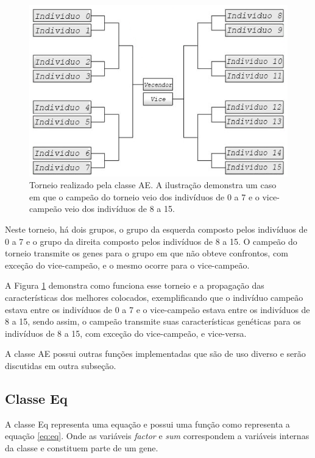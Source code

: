 \begin{figure}[htb]
    \caption{Torneio realizado pela classe AE. A ilustração demonstra um caso em que o campeão do torneio veio dos indivíduos de 0 a 7 e o vice-campeão veio dos indivíduos de 8 a 15.}
    \label{figura:funcao_playAll}
    \centering
    \includegraphics[scale=0.8]{images/ps/mata-mata}
    \fautor
\end{figure}

Neste torneio, há dois grupos, o grupo da esquerda composto pelos indivíduos de 0 a 7 e o grupo da direita composto pelos indivíduos de 8 a 15. O campeão do torneio transmite os genes para o grupo em que não obteve confrontos, com exceção do vice-campeão, e o mesmo ocorre para o vice-campeão.

A Figura \ref{figura:funcao_playAll} demonstra como funciona esse torneio e a propagação das características dos melhores colocados, exemplificando que o indivíduo campeão estava entre os indivíduos de 0 a 7 e o vice-campeão estava entre os indivíduos de 8 a 15, sendo assim, o campeão transmite suas características genéticas para os indivíduos de 8 a 15, com exceção do vice-campeão, e vice-versa.

A classe AE possui outras funções implementadas que são de uso diverso e serão discutidas em outra subseção.

\subsection{Classe Eq}

\newcommand{\var}[1]{\textit{#1}}

A classe Eq representa uma equação e possui uma função como representa a equação \ref{eq:eq}. Onde as variáveis \var{factor} e \var{sum} correspondem a variáveis internas da classe e constituem parte de um gene.

